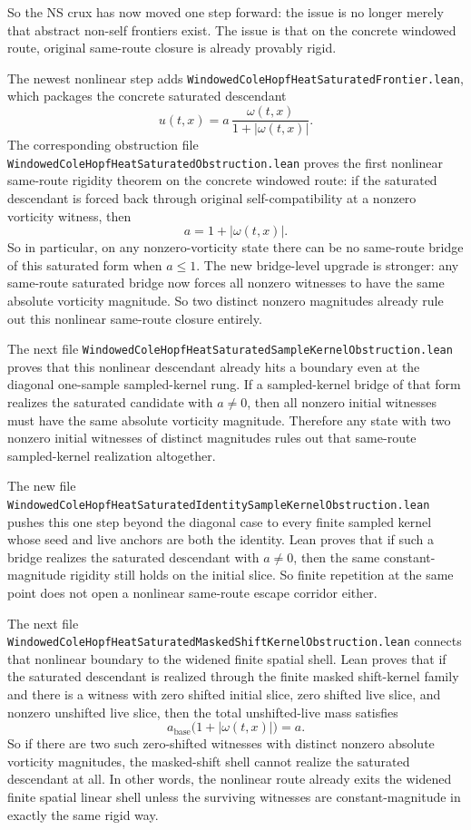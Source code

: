 \documentclass[11pt]{article}
\begin{document}
So the NS crux has now moved one step forward: the issue is no longer merely
that abstract non-self frontiers exist.  The issue is that on the concrete
windowed route, original same-route closure is already provably rigid.

The newest nonlinear step adds
\texttt{WindowedColeHopfHeatSaturatedFrontier.lean}, which packages the
concrete saturated descendant
\[
u(t,x)=a\,\frac{\omega(t,x)}{1+|\omega(t,x)|}.
\]
The corresponding obstruction file
\texttt{WindowedColeHopfHeatSaturatedObstruction.lean} proves the first
nonlinear same-route rigidity theorem on the concrete windowed route: if the
saturated descendant is forced back through original self-compatibility at a
nonzero vorticity witness, then
\[
  a = 1 + |\omega(t,x)|.
\]
So in particular, on any nonzero-vorticity state there can be no same-route
bridge of this saturated form when \(a \le 1\).  The new bridge-level upgrade
is stronger: any same-route saturated bridge now forces all nonzero witnesses
to have the same absolute vorticity magnitude.  So two distinct nonzero
magnitudes already rule out this nonlinear same-route closure entirely.

The next file
\texttt{WindowedColeHopfHeatSaturatedSampleKernelObstruction.lean} proves that
this nonlinear descendant already hits a boundary even at the diagonal
one-sample sampled-kernel rung.  If a sampled-kernel bridge of that form
realizes the saturated candidate with \(a \neq 0\), then all nonzero initial
witnesses must have the same absolute vorticity magnitude.  Therefore any
state with two nonzero initial witnesses of distinct magnitudes rules out that
same-route sampled-kernel realization altogether.

The new file
\texttt{WindowedColeHopfHeatSaturatedIdentitySampleKernelObstruction.lean}
pushes this one step beyond the diagonal case to every finite sampled kernel
whose seed and live anchors are both the identity.  Lean proves that if such a
bridge realizes the saturated descendant with \(a \neq 0\), then the same
constant-magnitude rigidity still holds on the initial slice.  So finite
repetition at the same point does not open a nonlinear same-route escape
corridor either.

The next file
\texttt{WindowedColeHopfHeatSaturatedMaskedShiftKernelObstruction.lean}
connects that nonlinear boundary to the widened finite spatial shell.  Lean
proves that if the saturated descendant is realized through the finite masked
shift-kernel family and there is a witness with zero shifted initial slice,
zero shifted live slice, and nonzero unshifted live slice, then the total
unshifted-live mass satisfies
\[
  a_{\mathrm{base}} \bigl(1 + |\omega(t,x)|\bigr) = a.
\]
So if there are two such zero-shifted witnesses with distinct nonzero absolute
vorticity magnitudes, the masked-shift shell cannot realize the saturated
descendant at all.  In other words, the nonlinear route already exits the
widened finite spatial linear shell unless the surviving witnesses are
constant-magnitude in exactly the same rigid way.
\end{document}
